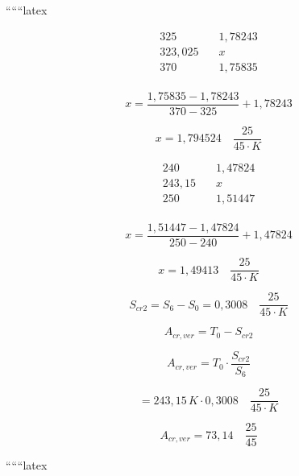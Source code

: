 ``````latex


\begin{align*}
325 & \quad 1,78243 \\
323,025 & \quad x \\
370 & \quad 1,75835 \\
\end{align*}

\[
x = \frac{1,75835 - 1,78243}{370 - 325} + 1,78243
\]

\[
x = 1,794524 \quad \frac{25}{45 \cdot K}
\]

\begin{align*}
240 & \quad 1,47824 \\
243,15 & \quad x \\
250 & \quad 1,51447 \\
\end{align*}

\[
x = \frac{1,51447 - 1,47824}{250 - 240} + 1,47824
\]

\[
x = 1,49413 \quad \frac{25}{45 \cdot K}
\]

\[
S_{cr2} = S_6 - S_0 = 0,3008 \quad \frac{25}{45 \cdot K}
\]

\[
A_{cr,ver} = T_0 - S_{cr2}
\]

\[
A_{cr,ver} = T_0 \cdot \frac{S_{cr2}}{S_6}
\]

\[
= 243,15 \, K \cdot 0,3008 \quad \frac{25}{45 \cdot K}
\]

\[
A_{cr,ver} = 73,14 \quad \frac{25}{45}
\]

``````latex



